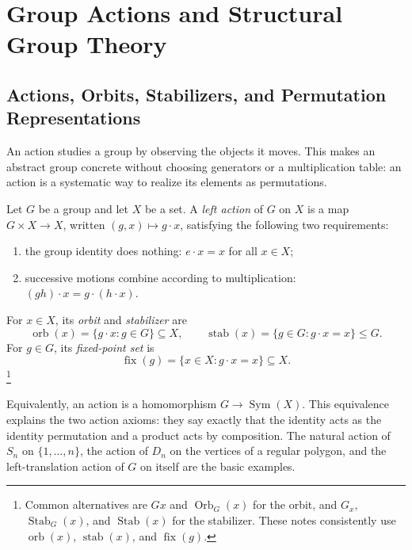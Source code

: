 \chapter[Group Actions and Structure]{Group Actions and Structural Group Theory}

\section{Actions, Orbits, Stabilizers, and Permutation Representations}

An action studies a group by observing the objects it moves.  This makes an
abstract group concrete without choosing generators or a multiplication table:
an action is a systematic way to realize its elements as permutations.

\begin{definition}
Let \(G\) be a group and let \(X\) be a set. A \emph{left action} of \(G\)
on \(X\) is a map \(G\times X\to X\), written \((g,x)\mapsto g\cdot x\),
satisfying the following two requirements:
\begin{enumerate}
\setlength{\itemsep}{5pt}
\item the group identity does nothing: \(e\cdot x=x\) for all \(x\in X\);
\item successive motions combine according to multiplication:
      \((gh)\cdot x=g\cdot(h\cdot x)\).
\end{enumerate}
For \(x\in X\), its \emph{orbit} and \emph{stabilizer} are
\[
\operatorname{orb}(x)=\{g\cdot x:g\in G\}\subseteq X,\qquad
\operatorname{stab}(x)=\{g\in G:g\cdot x=x\}\leq G.
\]
For \(g\in G\), its \emph{fixed-point set} is
\[
\operatorname{fix}(g)=\{x\in X:g\cdot x=x\}\subseteq X.
\]
\footnote{Common alternatives are \(Gx\) and \(\operatorname{Orb}_G(x)\) for
the orbit, and \(G_x\), \(\operatorname{Stab}_G(x)\), and
\(\operatorname{Stab}(x)\) for the stabilizer. These notes consistently use
\(\operatorname{orb}(x)\), \(\operatorname{stab}(x)\), and
\(\operatorname{fix}(g)\).}
\end{definition}

Equivalently, an action is a homomorphism \(G\to\operatorname{Sym}(X)\).
This equivalence explains the two action axioms: they say exactly that the
identity acts as the identity permutation and a product acts by composition.
The natural action of \(S_n\) on \(\{1,\ldots,n\}\), the action of \(D_n\)
on the vertices of a regular polygon, and the left-translation action of \(G\)
on itself are the basic examples.

